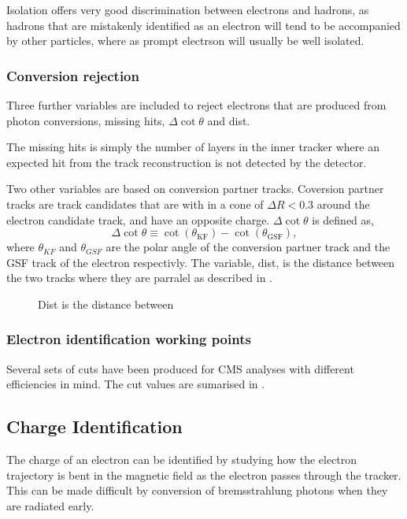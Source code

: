 Isolation offers very good discrimination between electrons and hadrons, as
hadrons that are mistakenly identified as an electron will tend to be
accompanied by other particles, where as prompt electrson will usually be well
isolated.

\subsubsection{Conversion rejection}
Three further variables are included to reject electrons that are produced from
photon conversions, missing hits, $\Delta\cot\theta$ and dist. 

The missing hits is simply the number of layers in the inner
tracker where an expected hit from the track reconstruction is not detected by
the detector.

Two other variables are based on conversion partner tracks.
Coversion partner tracks are track candidates that are with in a cone of $\Delta
R < 0.3$ around the electron candidate track, and have an opposite charge. 
$\Delta\cot\theta$ is defined as,
\begin{equation}
\Delta \cot \theta \equiv \cot(\theta_{\text{KF}}) - \cot(\theta_{\text{GSF}}),
\end{equation}
where $\theta_{KF}$ and $\theta_{GSF}$ are the polar angle of the conversion
partner track and the GSF track of the electron respectivly.
The variable, dist, is the distance between the two tracks where they are
parralel as described in .

\begin{figure}[htb]
  \centering
  \caption{Dist is the distance between}
  \label{fig:dist}
\end{figure}

\subsubsection{Electron identification working points}

Several sets of cuts have been produced for CMS analyses with different
efficiencies in mind. The cut values are sumarised in .

\subsection{Charge Identification}
The charge of an electron can be identified by studying how the electron trajectory
is bent in the magnetic field as the electron passes through the tracker. This
can be made difficult by conversion of bremsstrahlung photons when they are
radiated early. 

